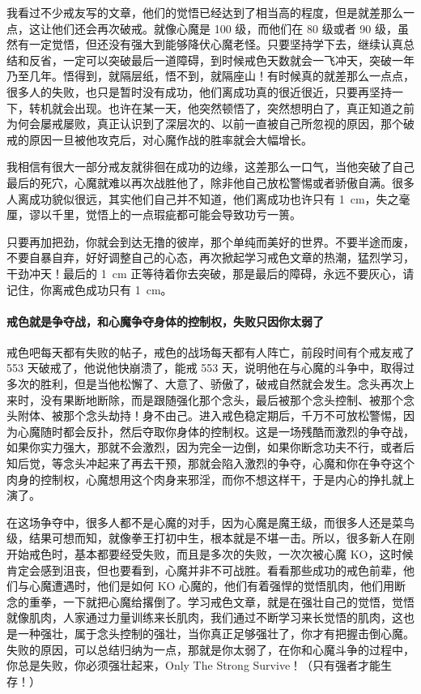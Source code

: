 我看过不少戒友写的文章，他们的觉悟已经达到了相当高的程度，但是就差那么一点，这让他们还会再次破戒。就像心魔是 100 级，而他们在 80 级或者 90 级，虽然有一定觉悟，但还没有强大到能够降伏心魔老怪。只要坚持学下去，继续认真总结和反省，一定可以突破最后一道障碍，到时候戒色天数就会一飞冲天，突破一年乃至几年。悟得到，就隔层纸，悟不到，就隔座山！有时候真的就差那么一点点，很多人的失败，也只是暂时没有成功，他们离成功真的很近很近，只要再坚持一下，转机就会出现。也许在某一天，他突然顿悟了，突然想明白了，真正知道之前为何会屡戒屡败，真正认识到了深层次的、以前一直被自己所忽视的原因，那个破戒的原因一旦被他攻克后，对心魔作战的胜率就会大幅增长。

我相信有很大一部分戒友就徘徊在成功的边缘，这差那么一口气，当他突破了自己最后的死穴，心魔就难以再次战胜他了，除非他自己放松警惕或者骄傲自满。很多人离成功貌似很远，其实他们自己并不知道，他们离成功也许只有 \SI{1}{\centi\metre}，失之毫厘，谬以千里，觉悟上的一点瑕疵都可能会导致功亏一篑。

只要再加把劲，你就会到达无撸的彼岸，那个单纯而美好的世界。不要半途而废，不要自暴自弃，好好调整自己的心态，再次掀起学习戒色文章的热潮，猛烈学习，干劲冲天！最后的 \SI{1}{\centi\metre} 正等待着你去突破，那是最后的障碍，永远不要灰心，请记住，你离戒色成功只有 \SI{1}{\centi\metre}。

\paragraph{戒色就是争夺战，和心魔争夺身体的控制权，失败只因你太弱了}

戒色吧每天都有失败的帖子，戒色的战场每天都有人阵亡，前段时间有个戒友戒了 553 天破戒了，他说他快崩溃了，能戒 553 天，说明他在与心魔的斗争中，取得过多次的胜利，但是当他松懈了、大意了、骄傲了，破戒自然就会发生。念头再次上来时，没有果断地断除，而是跟随强化那个念头，最后被那个念头控制、被那个念头附体、被那个念头劫持！身不由己。进入戒色稳定期后，千万不可放松警惕，因为心魔随时都会反扑，然后夺取你身体的控制权。这是一场残酷而激烈的争夺战，如果你实力强大，那就不会激烈，因为完全一边倒，如果你断念功夫不行，或者后知后觉，等念头冲起来了再去干预，那就会陷入激烈的争夺，心魔和你在争夺这个肉身的控制权，心魔想用这个肉身来邪淫，而你不想这样干，于是内心的挣扎就上演了。

在这场争夺中，很多人都不是心魔的对手，因为心魔是魔王级，而很多人还是菜鸟级，结果可想而知，就像拳王打初中生，根本就是不堪一击。所以，很多新人在刚开始戒色时，基本都要经受失败，而且是多次的失败，一次次被心魔 KO，这时候肯定会感到沮丧，但也要看到，心魔并非不可战胜。看看那些成功的戒色前辈，他们与心魔遭遇时，他们是如何 KO 心魔的，他们有着强悍的觉悟肌肉，他们用断念的重拳，一下就把心魔给撂倒了。学习戒色文章，就是在强壮自己的觉悟，觉悟就像肌肉，人家通过力量训练来长肌肉，我们通过不断学习来长觉悟的肌肉，这也是一种强壮，属于念头控制的强壮，当你真正足够强壮了，你才有把握击倒心魔。失败的原因，可以总结归纳为一点，那就是你太弱了，在你和心魔斗争的过程中，你总是失败，你必须强壮起来，Only The Strong Survive！（只有强者才能生存！）

